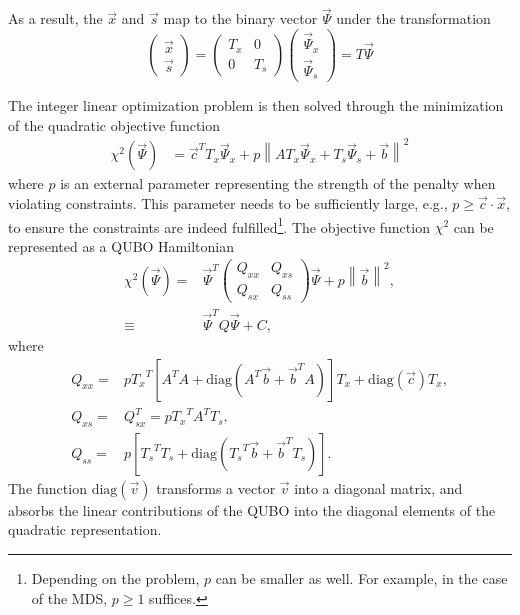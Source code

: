 \documentclass[prd,twocolumn,tightenlines,preprintnumbers,showpacs,superscriptaddress,notitlepage,nofootinbib,eqsecnum,floatfix,longbibliography,aps,10pt]{revtex4-2}
\begin{document}
As a result, the $\vec x$ and $\vec s$ map to the binary vector $\vec \Psi$ under the transformation
\begin{equation}
    \label{eq:bit-vector-mapping}
    \begin{pmatrix}
        \vec x \\ \vec s
    \end{pmatrix}
    =
    \begin{pmatrix}
        T_x & 0 \\ 0 & T_s
    \end{pmatrix}
    \begin{pmatrix}
        \vec \Psi_x \\ \vec \Psi_s
    \end{pmatrix}
    =
    T
    \vec \Psi
\end{equation}

The integer linear optimization problem is then solved through the minimization of the quadratic objective function
\begin{align}
 \label{eq:ilp-slack-bit-energy}
 \chi^2(\vec \Psi)
 &=
 \vec c^T T_x \vec \Psi_x + p \left\| A T_x \vec \Psi_x + T_s \vec \Psi_s + \vec b \right\|^2
\end{align}
where $p$ is an external parameter representing the strength of the penalty when violating constraints.
This parameter needs to be sufficiently large, e.g., $p \geq \vec c \cdot \vec x$, to ensure the constraints are indeed fulfilled\footnote{Depending on the problem, $p$ can be smaller as well.
For example, in the case of the MDS, $p\geq 1$ suffices.}.
The objective function $\chi^2$ can be represented as a QUBO Hamiltonian
\begin{align}
 \chi^2(\vec \Psi) =    &
 \vec \Psi^T
 \begin{pmatrix}
  Q_{xx} & Q_{xs} \\
  Q_{sx} & Q_{ss}
 \end{pmatrix}
 \vec \Psi + p\left \| \vec b \right\|^2, \\
 \equiv &  \vec \Psi^T Q  \vec \Psi + C,
 \label{eq:matrix_form}
\end{align}
where
{\small
\begin{align}
 \label{eq:qubo:components}
 Q_{xx} = & p {T_{x}}^T \left[ A^T A + \mathrm{diag} \left(A^T \vec b + \vec b^T A\right) \right] T_x + \mathrm{diag}(\vec c) T_x,                                                                    \\
 Q_{xs} = & Q_{sx}^T = p {T_{x}}^T A^T T_s,                                                                     \\
 Q_{ss} = & p\left[ {T_{s}}^T T_s + \mathrm{diag}\left( {T_{s}}^T \vec b + \vec b^T T_s\right) \right].
\end{align}}
The function $\mathrm{diag}(\vec v)$ transforms a vector $\vec v$ into a diagonal matrix, and absorbs the linear contributions of the QUBO into the diagonal elements of the quadratic representation.
\end{document}
